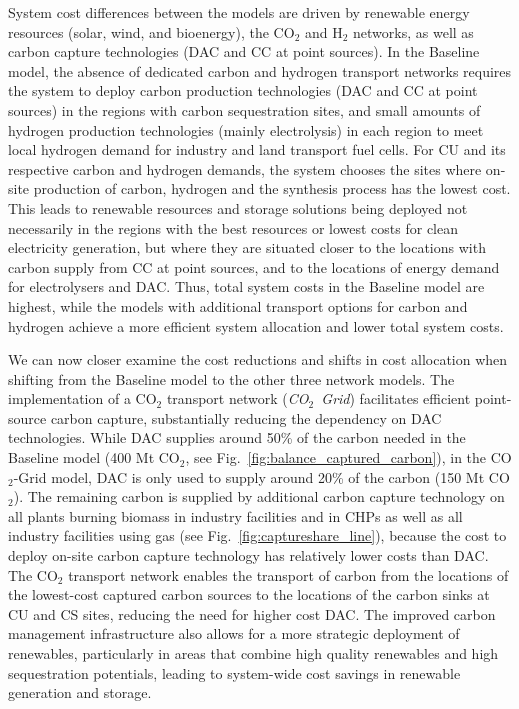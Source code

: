 \documentclass[twocolumn]{article}
\newcommand{\carbon}{CO$_2$}
\newcommand{\hydrogen}{H$_2$}
\newcommand{\modCO}{CO$_2$-Grid model}
\begin{document}
System cost differences between the models are driven by renewable energy resources (solar, wind, and bioenergy), the \carbon{} and \hydrogen{} networks, as well as carbon capture technologies (DAC and CC at point sources).
In the Baseline model, the absence of dedicated carbon and hydrogen transport networks requires the system to deploy carbon production technologies (DAC and CC at point sources) in the regions with carbon sequestration sites, and small amounts of hydrogen production technologies (mainly electrolysis) in each region to meet local hydrogen demand for industry and land transport fuel cells.
For CU and its respective carbon and hydrogen demands, the system chooses the sites where on-site production of carbon, hydrogen and the synthesis process has the lowest cost. This leads to renewable resources and storage solutions being deployed not necessarily in the regions with the best resources or lowest costs for clean electricity generation, but where they are situated closer to the locations with carbon supply from CC at point sources, and to the locations of energy demand for electrolysers and DAC.
Thus, total system costs in the Baseline model are highest, while the models with additional transport options for carbon and hydrogen achieve a more efficient system allocation and lower total system costs.

We can now closer examine the cost reductions and shifts in cost allocation when shifting from the Baseline model to the other three network models.
The implementation of a \carbon{} transport network (\textit{\carbon{}~Grid}) facilitates efficient point-source carbon capture, substantially reducing the dependency on DAC technologies. While DAC supplies around 50\% of the carbon needed in the Baseline model (400 Mt \carbon{}, see Fig.~\ref{fig:balance_captured_carbon}), in the \modCO{}, DAC is only used to supply around 20\% of the carbon (150 Mt \carbon{}). The remaining carbon is supplied by additional carbon capture technology on all plants burning biomass in industry facilities and in CHPs as well as all industry facilities using gas (see Fig.~\ref{fig:captureshare_line}), because the cost to deploy on-site carbon capture technology has relatively lower costs than DAC. The \carbon{} transport network enables the transport of carbon from the locations of the lowest-cost captured carbon sources to the locations of the carbon sinks at CU and CS sites, reducing the need for higher cost DAC. The improved carbon management infrastructure also allows for a more strategic deployment of renewables, particularly in areas that combine high quality renewables and high sequestration potentials, leading to system-wide cost savings in renewable generation and storage.
\end{document}
